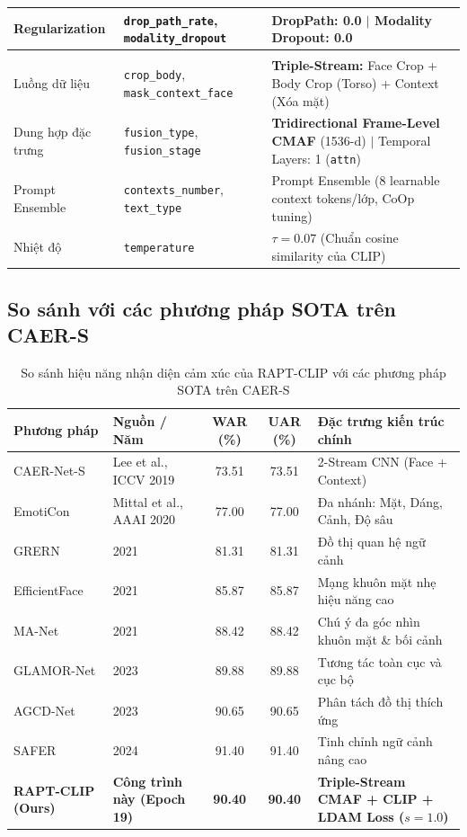 \documentclass[10pt,a4paper]{article}
\begin{document}
\begin{table}[H]
\begin{tabularx}{\textwidth}{p{3.2cm} p{4.2cm} X}
Regularization & \texttt{drop\_path\_rate}, \texttt{modality\_dropout} & DropPath: 0.0 $|$ Modality Dropout: 0.0 \\
\midrule
\rowcolor{grouprow} \multicolumn{3}{l}{\textbf{c. Luồng dữ liệu \& Kiến trúc dung hợp}} \\
Luồng dữ liệu & \texttt{crop\_body}, \texttt{mask\_context\_face} & \textbf{Triple-Stream:} Face Crop + Body Crop (Torso) + Context (Xóa mặt) \\
Dung hợp đặc trưng & \texttt{fusion\_type}, \texttt{fusion\_stage} & \textbf{Tridirectional Frame-Level CMAF} (1536-d) $|$ Temporal Layers: 1 (\texttt{attn}) \\
Prompt Ensemble & \texttt{contexts\_number}, \texttt{text\_type} & Prompt Ensemble (8 learnable context tokens/lớp, CoOp tuning) \\
Nhiệt độ & \texttt{temperature} & $\tau = 0.07$ (Chuẩn cosine similarity của CLIP) \\
\bottomrule
\end{tabularx}
\end{table}

\subsection{So sánh với các phương pháp SOTA trên CAER-S}

\begin{table}[H]
\centering
\small
\caption{So sánh hiệu năng nhận diện cảm xúc của RAPT-CLIP với các phương pháp SOTA trên CAER-S}
\label{tab:caers_sota_comparison}
\begin{tabularx}{\textwidth}{l l c c X}
\toprule
\rowcolor{tableheader}
\textbf{Phương pháp} & \textbf{Nguồn / Năm} & \textbf{WAR (\%)} & \textbf{UAR (\%)} & \textbf{Đặc trưng kiến trúc chính} \\
\midrule
CAER-Net-S & Lee et al., ICCV 2019 & 73.51 & 73.51 & 2-Stream CNN (Face + Context) \\
EmotiCon & Mittal et al., AAAI 2020 & 77.00 & 77.00 & Đa nhánh: Mặt, Dáng, Cảnh, Độ sâu \\
GRERN & 2021 & 81.31 & 81.31 & Đồ thị quan hệ ngữ cảnh \\
EfficientFace & 2021 & 85.87 & 85.87 & Mạng khuôn mặt nhẹ hiệu năng cao \\
MA-Net & 2021 & 88.42 & 88.42 & Chú ý đa góc nhìn khuôn mặt \& bối cảnh \\
GLAMOR-Net & 2023 & 89.88 & 89.88 & Tương tác toàn cục và cục bộ \\
AGCD-Net & 2023 & 90.65 & 90.65 & Phân tách đồ thị thích ứng \\
SAFER & 2024 & 91.40 & 91.40 & Tinh chỉnh ngữ cảnh nâng cao \\
\midrule
\rowcolor{grouprow}
\textbf{RAPT-CLIP (Ours)} & \textbf{Công trình này (Epoch 19)} & \textbf{90.40} & \textbf{90.40} & \textbf{Triple-Stream CMAF + CLIP + LDAM Loss ($s=1.0$)} \\
\bottomrule
\end{tabularx}
\end{table}
\end{document}
